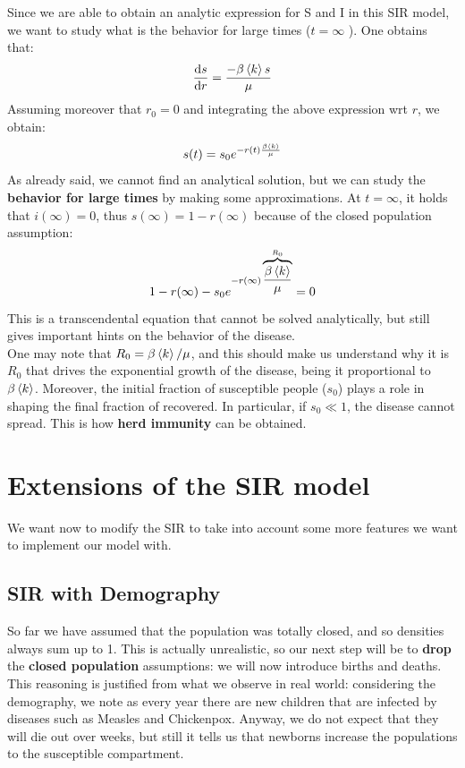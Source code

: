\documentclass[../main/main.tex]{subfiles}
\begin{document}
Since we are able to obtain an analytic expression for S and I in this SIR model, we want to study what is the behavior for large times ($ t = \infty$ ). One obtains that:
\begin{equation*}
  \dv{s}{r} = \frac{- \beta  \expval{k}  s}{\mu }
\end{equation*}
Assuming moreover that \( r_0 = 0  \) and integrating the above expression wrt \( r \), we obtain:
\begin{equation*}
  s(t) = s_0 e^{-r(t) \frac{\beta \expval{k} }{\mu }}
\end{equation*}
As already said, we cannot find an analytical solution, but we can study the \textbf{behavior for large times} by making some approximations. At \( t=\infty  \), it holds that \( i (\infty ) = 0 \), thus \( s(\infty ) = 1 - r(\infty ) \) because of the closed population assumption:
\begin{equation*}
  1 - r(\infty ) - s_0 e^{-r(\infty ) \overbrace{\frac{\beta \expval{k} }{\mu }}^{R_0}} = 0
\end{equation*}
This is a transcendental equation that cannot be solved analytically, but still gives important hints on the behavior of the disease.\\
One may note that \( R_0 = \beta \expval{k} / \mu   \), and this should make us understand why it is \( R_0 \) that drives the exponential growth of the disease, being it proportional to $\beta \expval{k}$. Moreover, the initial fraction of susceptible people ($s_0$) plays a role in shaping the final fraction of recovered. In particular, if \( s_0 \ll 1 \), the disease cannot spread. This is how \textbf{herd immunity} can be obtained.


\section{Extensions of the SIR model}
We want now to modify the SIR to take into account some more features we want to implement our model with.

\subsection{SIR with Demography}
So far we have assumed that the population was totally closed, and so densities always sum up to 1. This is actually unrealistic, so our next step will be to \textbf{drop} the \textbf{closed population} assumptions: we will now introduce births and deaths. This reasoning is justified from what we observe in real world: considering the demography, we note as every year there are new children that are infected by diseases such as Measles and Chickenpox. Anyway, we do not expect that they will die out over weeks, but still it tells us that newborns increase the populations to the susceptible compartment.\\ 
\end{document}
